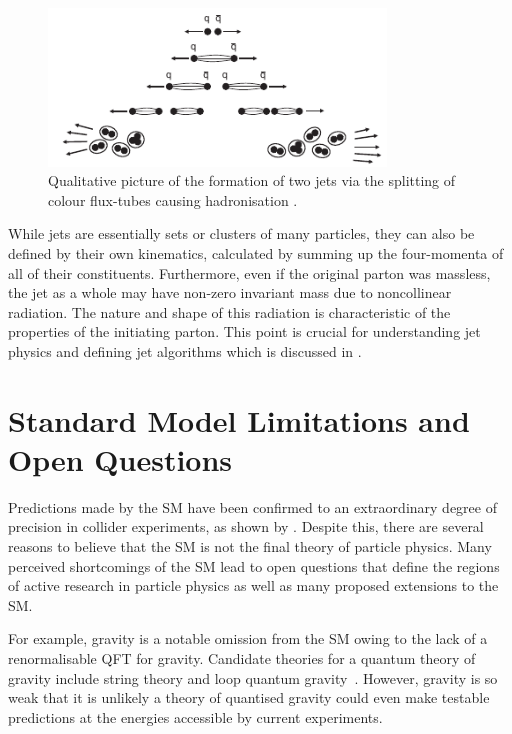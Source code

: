 \begin{figure}[h]
	\centering
	\includegraphics[width=0.8\textwidth]{Figures/standard_model/hadronisation.pdf}
	\caption{Qualitative picture of the formation of two jets via the splitting of colour flux-tubes causing hadronisation \cite{ModernParticlePhysics}.}
	\label{fig:hadronisation}
\end{figure}

While jets are essentially sets or clusters of many particles, they can also be defined by their own kinematics, calculated by summing up the four-momenta of all of their constituents.
Furthermore, even if the original parton was massless, the jet as a whole may have non-zero invariant mass due to noncollinear radiation.
The nature and shape of this radiation is characteristic of the properties of the initiating parton.
This point is crucial for understanding jet physics and defining jet algorithms which is discussed in .

\section{Standard Model Limitations and Open Questions}
\label{sec:sm_limitations}

Predictions made by the SM have been confirmed to an extraordinary degree of precision in collider experiments, as shown by .
Despite this, there are several reasons to believe that the SM is not the final theory of particle physics.
Many perceived shortcomings of the SM lead to open questions that define the regions of active research in particle physics as well as many proposed extensions to the SM\@.

For example, gravity is a notable omission from the SM owing to the lack of a renormalisable QFT for gravity.
Candidate theories for a quantum theory of gravity include string theory and loop quantum gravity~\cite{GravityQFT}.
However, gravity is so weak that it is unlikely a theory of quantised gravity could even make testable predictions at the energies accessible by current experiments.

